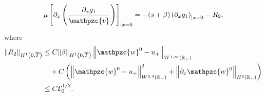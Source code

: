 \documentclass[AHL,Unicode,longabstracts,published]{cedram}
\newcommand{\R}{\mathbb{R}}
\newcommand{\p}{\partial}
\newcommand{\bv}{\bar{\mathpzc{v}}}
\newcommand{\cE}{\mathcal E}
\newcommand{\tw}{\mathpzc{w}}
\begin{document}
\begin{lemm}
\begin{enumerate}
\begin{equation}
\mu \left[\partial_x \left(\dfrac{\partial_x g_1}{\bv}\right) \right]_{|x=0} = -(s+\beta)\left(\partial_x g_1\right)_{|x=0} - R_2,
\end{equation}
where
\begin{equation}\label{est:R2}
\begin{aligned}
\|R_2\|_{H^1\left(0,\overline{T}\right)}&\leq C \|\beta\|_{H^1\left(0, \overline{T}\right)}\left\|\tw^0-u_+\right\|_{W^{1,\infty}(\R_+)}
\\
&\quad + C\left(\left\| \tw^0-u_+\right\|_{W^{2,4}(\R_+)}^2 + \left\|\p_x \tw^0\right\|_{H^2(\R_+)} \right)\\
&\leq C \cE_0^{1/2}.
\end{aligned}
\end{equation}
\end{enumerate}
\end{lemm}
\end{document}
